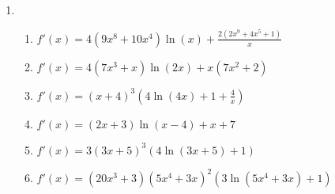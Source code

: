 \documentclass[a4paper,12pt]{article}
\begin{document}
\begin{enumerate}
\item
    \begin{enumerate}
    \item \sspacer$f'(x) = 4(9x^8 + 10x^4)\ln(x) + \frac{2(2x^9 + 4x^5 + 1)}{x}$
    \item \sspacer$f'(x) = 4(7x^3 + x)\ln(2x) + x(7x^2 + 2)$
    \item \sspacer$f'(x) = (x+4)^3\left(4\ln(4x) + 1 + \frac{4}{x}\right)$
    \item \sspacer$f'(x) = (2x+3)\ln(x-4) + x + 7$
    \item \sspacer$f'(x) = 3(3x+5)^3(4\ln(3x+5) + 1)$
    \item \sspacer$f'(x) = (20x^3 + 3)(5x^4 + 3x)^2(3\ln(5x^4 + 3x) + 1)$
    \end{enumerate}


\end{enumerate}
\end{document}
